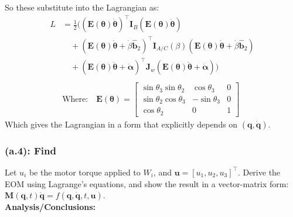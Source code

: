 \documentclass[titlepage]{article}
\begin{document}
\begin{mdframed}[linewidth=1pt, innertopmargin=10pt, innerbottommargin=10pt]
	So these substitute into the Lagrangian as:
	\begin{equation}
		\begin{split}
			L&=\frac{1}{2}\bigg(\left(\boldsymbol{E}(\boldsymbol{\theta})\dot{\boldsymbol{\theta}}\right)^\top\boldsymbol{I}_B\left(\boldsymbol{E}(\boldsymbol{\theta})\dot{\boldsymbol{\theta}}\right) \\
			&\quad+\left(\boldsymbol{E}(\boldsymbol{\theta})\dot{\boldsymbol{\theta}}+\dot{\beta}\hat{\boldsymbol{b}}_2\right)^\top\boldsymbol{I}_{A/C}(\beta)\left(\boldsymbol{E}(\boldsymbol{\theta})\dot{\boldsymbol{\theta}}+\dot{\beta}\hat{\boldsymbol{b}}_2\right) \\
			&\quad+\left(\boldsymbol{E}(\boldsymbol{\theta})\dot{\boldsymbol{\theta}}+\dot{\boldsymbol{\alpha}}\right)^\top\boldsymbol{J}_w\left(\boldsymbol{E}(\boldsymbol{\theta})\dot{\boldsymbol{\theta}}+\dot{\boldsymbol{\alpha}}\right)\bigg) \\
			\\
			&\text{Where:}\quad\boldsymbol{E}(\boldsymbol{\theta})=
			\begin{bmatrix}
				\sin\theta_3\sin\theta_2 & \cos\theta_3 & 0 \\
				\sin\theta_2\cos\theta_3 & -\sin\theta_3 & 0 \\
				\cos\theta_2 & 0 & 1
			\end{bmatrix}
		\end{split}
		\label{eq:lagrangian}
	\end{equation}
	Which gives the Lagrangian in a form that explicitly depends on $(\boldsymbol{q},\dot{\boldsymbol{q}})$.
\end{mdframed}

\subsubsection*{(a.4): Find}

Let $u_i$ be the motor torque applied to $W_i$, and $\boldsymbol{u}=[u_1,u_2,u_3]^\top$. Derive the EOM using Lagrange's equations, and show the result in a vector-matrix form: $\boldsymbol{M}(\boldsymbol{q},t)\ddot{\boldsymbol{q}}=f(\boldsymbol{q},\dot{\boldsymbol{q}},t,\boldsymbol{u})$.\\

\textbf{Analysis/Conclusions:}\\
\end{document}
